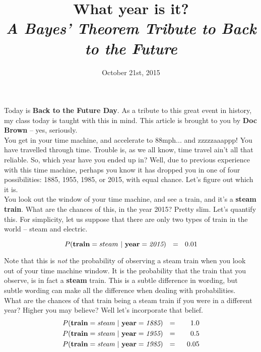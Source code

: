 \documentclass[a4paper,10pt]{article}
\title{What year is it?\\
\em A Bayes' Theorem Tribute to Back to the Future}
\date{October 21st, 2015}
\begin{document}
\vspace{-1cm}
\maketitle


\noindent Today is {\bf Back to the Future Day}.  As a tribute to this great event in history, my class today is taught with this in mind.
\noindent This article is brought to you by {\bf Doc Brown} -- yes, seriously.\\



 You get in your time machine, and accelerate to 88mph... and zzzzzaaappp!  You have travelled through time.  Trouble is, as
we all know, time travel ain't all that reliable.  So, which year have you ended up in? Well, due to previous experience with this time machine,
perhaps you know it has dropped you in one of four possibilities: 1885, 1955, 1985, or 2015, with equal chance.  Let's figure out which it is.\\

You look out the window of your time machine, and see a train, and it's a {\bf steam train}.  What are the chances of this, in the year 2015? Pretty slim.  Let's quantify this. For simplicity, let us suppose that there are only two types of train in the world -- steam and electric.

\[
P({\bf train}=steam~|~{\bf year}=\textit{2015})~~=~~ 0.01\\
\]

%

Note that this is {\em not} the probability of observing a steam train when you look out of your time machine window.
It is the probability that the train that you observe, is in fact a {\bf steam} train.
This is a subtle difference in wording, but subtle wording can make all the difference when dealing with probabilities.\\

\noindent What are the chances of that train being a steam train if you were in a different year? Higher you may believe? Well let's incorporate that belief. 
\begin{eqnarray*}
P({\bf train}=\textit{steam}~|~{\bf year}=\textit{1885})~~&=&~~ 1.0\\
P({\bf train}=\textit{steam}~|~{\bf year}=\textit{1955} )~~&=&~~ 0.5\\
P({\bf train}=\textit{steam}~|~{\bf year}=\textit{1985})~~&=&~~ 0.05\\
\end{eqnarray*}
\end{document}
